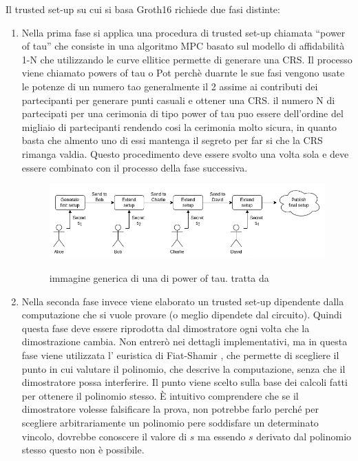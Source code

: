 Il trusted set-up su cui si basa Groth16 richiede due fasi distinte:
\begin{enumerate}
    \item Nella prima fase si applica una procedura di trusted set-up chiamata “power of tau” che consiste in una algoritmo MPC
    basato sul modello di affidabilità 1-N che utilizzando le curve ellitice permette di generare una CRS. Il processo viene
    chiamato powers of tau o Pot perchè duarnte le sue fasi vengono usate le potenze di un numero tao generalmente il 2
    assime ai contributi dei partecipanti per generare punti casuali e ottener una CRS. il numero N di partecipati per una
    cerimonia di tipo power of tau puo essere dell'ordine del migliaio di partecipanti rendendo cosi la cerimonia molto
    sicura, in quanto basta che almento uno di essi mantenga il segreto per far si che la CRS rimanga valdia. Questo
    procedimento deve essere svolto una volta sola e deve essere combinato con il processo della fase successiva.
    \begin{figure}[H]
        \centering
        \includegraphics[width=13cm]{./chapters/1.state-of-art/images/13.power_of_tao.png}
        \label{fig:powers_of_tao}
        \captionsetup{justification=centering}
        \caption{immagine generica di una di power of tau. tratta da \cite{how-do-trusted-setups-work}}
    \end{figure}
    \item Nella seconda fase invece viene elaborato un trusted set-up dipendente dalla computazione che si vuole provare (o
    meglio dipendete dal circuito). Quindi questa fase deve essere riprodotta dal dimostratore ogni volta che la
    dimostrazione cambia. Non entrerò nei dettagli implementativi, ma in questa fase viene utilizzata l' euristica di Fiat-Shamir
    , che permette di scegliere il punto in cui valutare il polinomio, che descrive la computazione, senza che il
    dimostratore possa interferire. Il punto viene scelto sulla base dei calcoli fatti per ottenere il polinomio stesso. È
    intuitivo comprendere che se il dimostratore volesse falsificare la prova, non potrebbe farlo perché per scegliere
    arbitrariamente un polinomio pere soddisfare un determinato vincolo, dovrebbe conoscere il valore di $s$ ma essendo
    $s$ derivato dal polinomio stesso questo non è possibile.
\end{enumerate}

